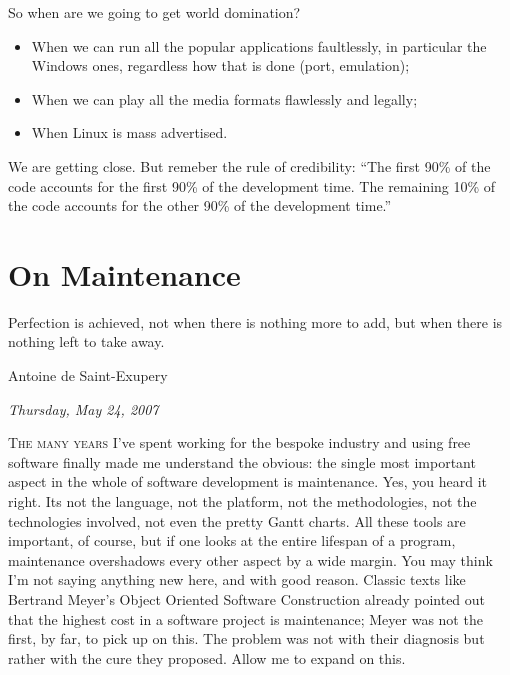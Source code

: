 \documentclass{book}
\begin{document}
So when are we going to get world domination?

\begin{itemize}
\item When we can run all the popular applications faultlessly, in
  particular the Windows ones, regardless how that is done (port,
  emulation);
\item When we can play all the media formats flawlessly and legally;
\item When Linux is mass advertised.
\end{itemize}

We are getting close. But remeber the rule of credibility: ``The first
90\% of the code accounts for the first 90\% of the development
time. The remaining 10\% of the code accounts for the other 90\% of
the development time.''

\chapter{On Maintenance}

\epigraph{Perfection is achieved, not when there is nothing more to add,
  but when there is nothing left to take away.}{Antoine de Saint-Exupery}

\begin{flushright}
  \emph{Thursday, May 24, 2007}
\end{flushright}

\lettrine{T}{he many years} I've spent working for the bespoke
industry and using free software finally made me understand the
obvious: the single most important aspect in the whole of software
development is maintenance. Yes, you heard it right. Its not the
language, not the platform, not the methodologies, not the
technologies involved, not even the pretty Gantt charts. All these
tools are important, of course, but if one looks at the entire
lifespan of a program, maintenance overshadows every other aspect by a
wide margin. You may think I'm not saying anything new here, and with
good reason. Classic texts like Bertrand Meyer's Object Oriented
Software Construction already pointed out that the highest cost in a
software project is maintenance; Meyer was not the first, by far, to
pick up on this. The problem was not with their diagnosis but rather
with the cure they proposed. Allow me to expand on this.
\end{document}
